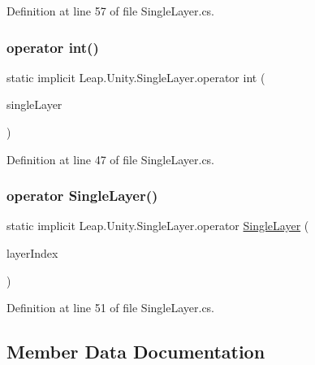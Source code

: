 Definition at line 57 of file Single\+Layer.\+cs.

\mbox{\label{struct_leap_1_1_unity_1_1_single_layer_a1e00fd683fac42db7b88412ebf02d62a}} 
\subsubsection{\texorpdfstring{operator int()}{operator int()}}
{\footnotesize\ttfamily static implicit Leap.\+Unity.\+Single\+Layer.\+operator int (\begin{DoxyParamCaption}\item[{\mbox{\hyperlink{struct_leap_1_1_unity_1_1_single_layer}{Single\+Layer}}}]{single\+Layer }\end{DoxyParamCaption})\hspace{0.3cm}{\ttfamily [static]}}



Definition at line 47 of file Single\+Layer.\+cs.

\mbox{\label{struct_leap_1_1_unity_1_1_single_layer_aaddddeb522c951355a05c1aff7cc45ca}} 
\subsubsection{\texorpdfstring{operator SingleLayer()}{operator SingleLayer()}}
{\footnotesize\ttfamily static implicit Leap.\+Unity.\+Single\+Layer.\+operator \mbox{\hyperlink{struct_leap_1_1_unity_1_1_single_layer}{Single\+Layer}} (\begin{DoxyParamCaption}\item[{int}]{layer\+Index }\end{DoxyParamCaption})\hspace{0.3cm}{\ttfamily [static]}}



Definition at line 51 of file Single\+Layer.\+cs.



\subsection{Member Data Documentation}
\mbox{\label{struct_leap_1_1_unity_1_1_single_layer_a5e955c6fd2ba1991b97b333e176f005b}} 
